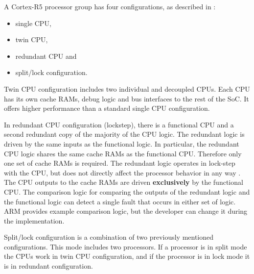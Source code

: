 A Cortex-R5 processor group has four configurations, as described in \citep{cortex_r5_reference_manual}:
\begin{itemize}

    \item single CPU,
    \item twin CPU,
    \item redundant CPU and
    \item split/lock configuration.
    
\end{itemize}

Twin CPU configuration includes two individual and decoupled CPUs. Each CPU has its own
cache RAMs, debug logic and bus interfaces to the rest of the SoC. It
offers higher performance than a standard single CPU configuration. 

In redundant CPU configuration (lockstep), there is a functional CPU and a second redundant copy of the majority of the CPU logic. The redundant logic is driven by the same inputs as the functional logic.  In particular, the redundant CPU logic shares the same cache RAMs as the functional CPU. Therefore only one set of cache RAMs is required. The redundant logic
operates in lock-step with the CPU, but does not directly affect the processor behavior in any way \citep{cortex_r5_reference_manual}. The CPU outputs to the cache RAMs are driven \textbf{exclusively} by the functional CPU. The comparison logic for comparing the outputs of the redundant logic and the functional logic can detect a single fault that occurs in either set of logic. ARM provides example comparison logic, but the developer can change it during the implementation. 

Split/lock configuration is a combination of two previously mentioned configurations. This mode includes two processors. If a processor is in split mode the CPUs work in twin CPU configuration, and if the processor is in lock mode it is in redundant configuration.

